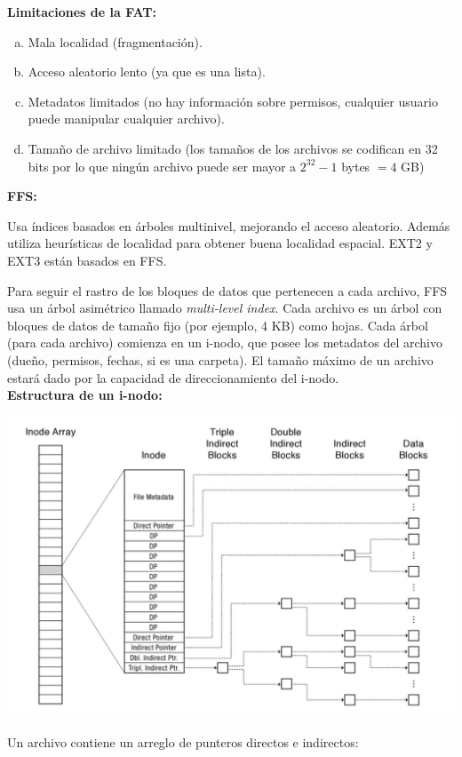 \documentclass[a4paper,10pt,spanish]{article}
\begin{document}
\textbf{Limitaciones de la FAT:}

\begin{enumerate}[a.]
\item Mala localidad (fragmentación).
\item Acceso aleatorio lento (ya que es una lista).
\item Metadatos limitados (no hay información sobre permisos, cualquier usuario puede manipular cualquier archivo).
\item Tamaño de archivo limitado (los tamaños de los archivos se codifican en 32 bits por lo que ningún archivo puede ser mayor a $2^{32}-1$ bytes $=4$ GB)
\end{enumerate}

\textbf{FFS:}

Usa índices basados en árboles multinivel, mejorando el acceso aleatorio. Además utiliza heurísticas de localidad para obtener buena localidad espacial. EXT2 y EXT3 están basados en FFS.

Para seguir el rastro de los bloques de datos que pertenecen a cada archivo, FFS usa un árbol asimétrico llamado \textit{multi-level index}. Cada archivo es un árbol con bloques de datos de tamaño fijo (por ejemplo, 4 KB) como hojas. Cada árbol (para cada archivo) comienza en un i-nodo, que posee los metadatos del archivo (dueño, permisos, fechas, si es una carpeta). El tamaño máximo de un archivo estará dado por la capacidad de direccionamiento del i-nodo. \\

\textbf{Estructura de un i-nodo:}

\includegraphics[width=\linewidth]{inodo}

Un archivo contiene un arreglo de punteros directos e indirectos:
\end{document}
